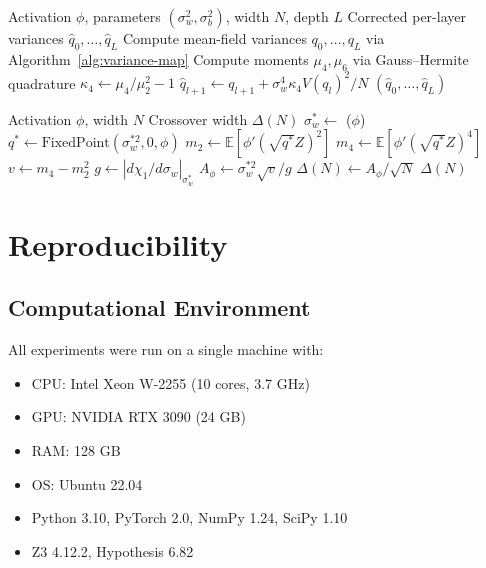 \documentclass[10pt]{article}
\newcommand{\EE}{\mathbb{E}}
\begin{document}
\begin{algorithm}[H]
\caption{Finite-Width Corrected Variance}
\label{alg:finite-width}
\begin{algorithmic}[1]
\Require Activation $\phi$, parameters $(\sigma_w^2, \sigma_b^2)$, width $N$, depth $L$
\Ensure Corrected per-layer variances $\hat{q}_0, \ldots, \hat{q}_L$
\State Compute mean-field variances $q_0, \ldots, q_L$ via Algorithm~\ref{alg:variance-map}
\State Compute moments $\mu_4, \mu_6$ via Gauss--Hermite quadrature
\State $\kappa_4 \gets \mu_4/\mu_2^2 - 1$
    \State $\hat{q}_{l+1} \gets q_{l+1} + \sigma_w^4 \kappa_4 V(q_l)^2 / N$
\EndFor
\State \Return $(\hat{q}_0, \ldots, \hat{q}_L)$
\end{algorithmic}
\end{algorithm}

\begin{algorithm}[H]
\caption{Crossover Width Estimation}
\label{alg:crossover}
\begin{algorithmic}[1]
\Require Activation $\phi$, width $N$
\Ensure Crossover width $\Delta(N)$
\State $\sigma_w^* \gets$ ($\phi$)
\State $q^* \gets \text{FixedPoint}(\sigma_w^{*2}, 0, \phi)$
\State $m_2 \gets \EE[\phi'(\sqrt{q^*}Z)^2]$
\State $m_4 \gets \EE[\phi'(\sqrt{q^*}Z)^4]$
\State $v \gets m_4 - m_2^2$ 
\State $g \gets |d\chi_1/d\sigma_w|_{\sigma_w^*}$ 
\State $A_\phi \gets \sigma_w^{*2} \sqrt{v} / g$
\State $\Delta(N) \gets A_\phi / \sqrt{N}$
\State \Return $\Delta(N)$
\end{algorithmic}
\end{algorithm}
\section{Reproducibility}
\label{app:reproducibility}

\subsection{Computational Environment}

All experiments were run on a single machine with:
\begin{itemize}[nosep]
    \item CPU: Intel Xeon W-2255 (10 cores, 3.7 GHz)
    \item GPU: NVIDIA RTX 3090 (24 GB)
    \item RAM: 128 GB
    \item OS: Ubuntu 22.04
    \item Python 3.10, PyTorch 2.0, NumPy 1.24, SciPy 1.10
    \item Z3 4.12.2, Hypothesis 6.82
\end{itemize}
\end{document}
